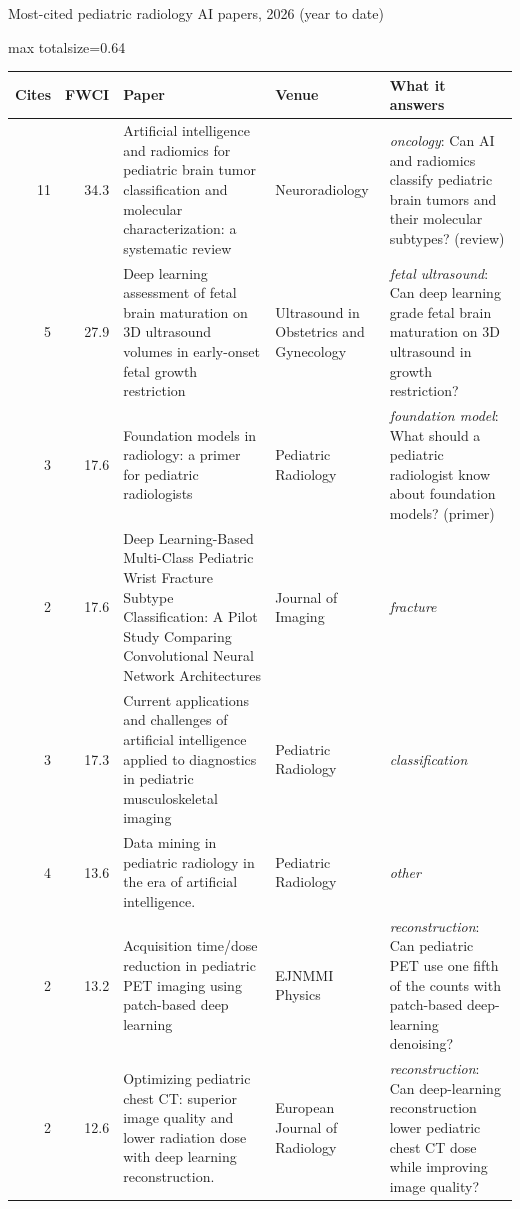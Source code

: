 \documentclass[aspectratio=169]{beamer}
\renewcommand{\arraystretch}{1.08}
\begin{document}
\begin{frame}[category=Journals/Preprints]{Most-cited pediatric radiology AI papers, 2026 (year to date)}
\tiny
\begin{adjustbox}{max totalsize={\textwidth}{0.64\textheight}}
\renewcommand{\arraystretch}{1.2}
\begin{tabular}{|r|r|>{\raggedright\arraybackslash}p{}|>{\raggedright\arraybackslash}p{}|>{\raggedright\arraybackslash}p{}|}
\hline \textbf{Cites} & \textbf{FWCI} & \textbf{Paper} & \textbf{Venue} & \textbf{What it answers} \\ \hline
11 & 34.3 & Artificial intelligence and radiomics for pediatric brain tumor classification and molecular characterization: a systematic review & Neuroradiology & \textit{oncology}: Can AI and radiomics classify pediatric brain tumors and their molecular subtypes? (review) \\ \hline
5 & 27.9 & Deep learning assessment of fetal brain maturation on 3D ultrasound volumes in early-onset fetal growth restriction & Ultrasound in Obstetrics and Gynecology & \textit{fetal ultrasound}: Can deep learning grade fetal brain maturation on 3D ultrasound in growth restriction? \\ \hline
3 & 17.6 & Foundation models in radiology: a primer for pediatric radiologists & Pediatric Radiology & \textit{foundation model}: What should a pediatric radiologist know about foundation models? (primer) \\ \hline
2 & 17.6 & Deep Learning-Based Multi-Class Pediatric Wrist Fracture Subtype Classification: A Pilot Study Comparing Convolutional Neural Network Architectures & Journal of Imaging & \textit{fracture} \\ \hline
3 & 17.3 & Current applications and challenges of artificial intelligence applied to diagnostics in pediatric musculoskeletal imaging & Pediatric Radiology & \textit{classification} \\ \hline
4 & 13.6 & Data mining in pediatric radiology in the era of artificial intelligence. & Pediatric Radiology & \textit{other} \\ \hline
2 & 13.2 & Acquisition time/dose reduction in pediatric PET imaging using patch-based deep learning & EJNMMI Physics & \textit{reconstruction}: Can pediatric PET use one fifth of the counts with patch-based deep-learning denoising? \\ \hline
2 & 12.6 & Optimizing pediatric chest CT: superior image quality and lower radiation dose with deep learning reconstruction. & European Journal of Radiology & \textit{reconstruction}: Can deep-learning reconstruction lower pediatric chest CT dose while improving image quality? \\ \hline

\end{tabular}
\end{adjustbox}
\end{frame}
\end{document}
